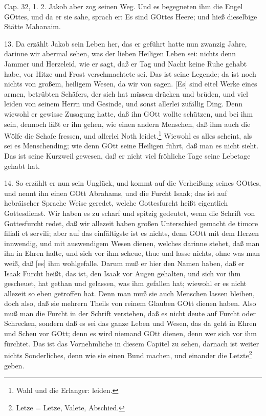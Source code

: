 \begin{schriftzitat}
Cap. 32, 1. 2. Jakob aber zog seinen Weg. Und es begegneten ihm die Engel GOttes, und da er sie sahe, sprach er: Es sind GOttes Heere; und hieß dieselbige Stätte Mahanaim.
\end{schriftzitat}

13. Da erzählt Jakob sein Leben her, das er geführt hatte nun zwanzig Jahre, darinne wir abermal sehen, was der lieben Heiligen Leben sei: nichts denn Jammer und Herzeleid, wie er sagt, daß er Tag und Nacht keine Ruhe gehabt habe, vor Hitze und Frost verschmachtete sei. Das ist seine Legende; da ist noch nichts von großem, heiligem Wesen, da wir von sagen. [Es] sind eitel Werke eines armen, betrübten Schäfers, der sich hat müssen drücken und brüden, und viel leiden von seinem Herrn und Gesinde, und sonst allerlei zufällig Ding. Denn wiewohl er gewisse
Zusagung hatte, daß ihn GOtt wollte schützen, und bei ihm sein, dennoch läßt er ihn gehen, wie einen andern Menschen, daß ihm auch die Wölfe die Schafe fressen, und allerlei Noth leidet.\footnote{Wahl und die Erlanger: leiden.} Wiewohl es alles scheint, als sei es Menschending; wie denn GOtt seine Heiligen führt, daß man es nicht sieht. Das ist seine Kurzweil gewesen, daß er nicht viel fröhliche Tage seine Lebetage gehabt hat.

14. So erzählt er nun sein Unglück, und kommt auf die Verheißung seines GOttes, und nennt ihn einen GOtt Abrahams, und die Furcht Isaak; das ist auf hebräischer Sprache Weise geredet, welche Gottesfurcht heißt eigentlich Gottesdienst. Wir haben es zu scharf und spitzig gedeutet, wenn die Schrift von Gottesfurcht redet, daß wir allezeit haben großen Unterschied gemacht de timore filiali et servili; aber auf das einfältigste ist es nichts, denn GOtt mit dem Herzen innwendig, und mit auswendigem Wesen dienen, welches darinne stehet, daß man ihn in Ehren halte, und sich vor ihm scheue, thue und lasse nichts, ohne was man weiß, daß [es] ihm wohlgefalle. Darum muß er hier den Namen haben, daß er Isaak Furcht heißt, das ist, den Isaak vor Augen gehalten, und sich vor ihm gescheuet, hat gethan und gelassen, was ihm gefallen hat; wiewohl er es nicht allezeit so eben getroffen hat. Denn man muß sie auch Menschen lassen bleiben, doch also, daß sie mehrern Theils von reinem Glauben GOtt dienen haben. Also muß man die Furcht in der Schrift verstehen, daß es nicht deute auf Furcht oder Schrecken, sondern daß es sei das ganze Leben und Wesen, das da geht in Ehren und Scheu vor GOtt; denn es wird niemand GOtt dienen, denn wer sich vor ihm fürchtet. Das ist das Vornehmliche in diesem Capitel zu sehen, darnach ist weiter nichts Sonderliches, denn wie sie einen Bund machen, und einander die Letzte\footnote{Letze = Letze, Valete, Abschied.} geben.

